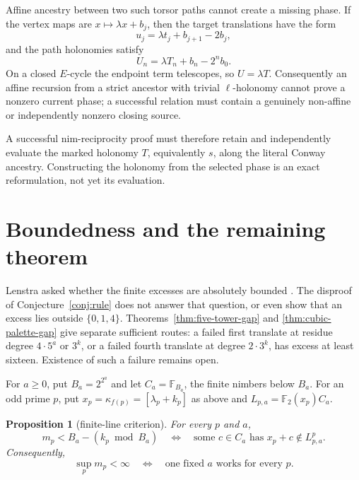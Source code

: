 \documentclass[11pt]{article}
\newtheorem{proposition}[theorem]{Proposition}
\theoremstyle{definition}
\theoremstyle{remark}
\begin{document}
Affine ancestry between two such torsor paths cannot create a missing phase.
If the vertex maps are $x\mapsto\lambda x+b_j$, then the target translations
have the form
\[
 u_j=\lambda t_j+b_{j+1}-2b_j,
\]
and the path holonomies satisfy
\[
 U_n=\lambda T_n+b_n-2^n b_0.
\]
On a closed $E$-cycle the endpoint term telescopes, so $U=\lambda T$.
Consequently an affine recursion from a strict ancestor with trivial
$\ell$-holonomy cannot prove a nonzero current phase; a successful relation
must contain a genuinely non-affine or independently nonzero closing source.

A successful nim-reciprocity proof must therefore retain and independently
evaluate the marked holonomy $T$, equivalently $s$, along the literal Conway
ancestry.  Constructing the holonomy from the selected phase is an exact
reformulation, not yet its evaluation.

\section{Boundedness and the remaining theorem}\label{sec:bounded}

Lenstra asked whether the finite excesses are absolutely bounded
\cite{lenstra1977}.  The disproof of Conjecture~\ref{conj:rule} does not
answer that question, or even show that an excess lies outside $\{0,1,4\}$.
Theorems~\ref{thm:five-tower-gap} and \ref{thm:cubic-palette-gap} give
separate sufficient routes: a failed first translate at residue degree
$4\cdot5^a$ or $3^k$, or a failed fourth translate at degree $2\cdot3^k$,
has excess at least sixteen.  Existence of such a failure remains open.

For $a\geq0$, put $B_a=2^{2^a}$ and let $C_a=\mathbb F_{B_a}$, the
finite nimbers below $B_a$.  For an odd prime $p$, put
$x_p=\kappa_{f(p)}=[\lambda_p+k_p]$ as above and
$L_{p,a}=\mathbb F_2(x_p)C_a$.

\begin{proposition}[finite-line criterion]\label{prop:bounded}
For every $p$ and $a$,
\[
 m_p<B_a-(k_p\bmod B_a)
 \quad\Longleftrightarrow\quad
 \text{some }c\in C_a\text{ has }x_p+c\notin L_{p,a}^p.
\]
Consequently,
\[
 \sup_p m_p<\infty
 \quad\Longleftrightarrow\quad
 \text{one fixed $a$ works for every $p$}.
\]
\end{proposition}
\end{document}
